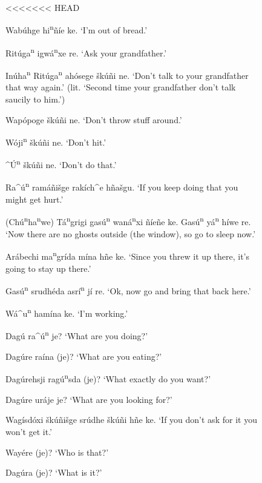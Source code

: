 \documentclass[output=paper]{LSP/langsci}
\begin{document}
\begin{figure}[p]
\begin{list}{}{} \itemsep1pt \parskip0pt 
<<<<<<< HEAD
\item{Wab\'uhge hi\textsuperscript{n}ñíe ke. `I'm out of bread.'}
\item{Rit\'uga\textsuperscript{n} igwá\textsuperscript{n}xe re. `Ask your grandfather.'}
\item{In\'uha\textsuperscript{n} Rit\'uga\textsuperscript{n} ahósege šk\'uñi ne. `Don't talk to your grandfather that way again.' (lit. `Second time your grandfather don't talk saucily to him.')}
\item{Wapópoge \v{s}k\'uñi ne. `Don't throw stuff around.'}
\item{Wóji\textsuperscript{n} \v{s}k\'uñi ne. `Don't hit.'}
\item{\^{ }\'U\textsuperscript{n} \v{s}k\'uñi ne. `Don't do that.'}
\item{}
\item{Ra\^{ }\'u\textsuperscript{n} ramáñi\v{s}ge rakích\^{ }e hña\v{s}gu. `If you keep doing that you might get hurt.'}
\item{(Ch\'u\textsuperscript{n}ha\textsuperscript{n}we) Tá\textsuperscript{n}grigi gas\'u\textsuperscript{n} waná\textsuperscript{n}xi ñíeñe ke. Gas\'u\textsuperscript{n} yá\textsuperscript{n} híwe re. `Now there are no ghosts outside (the window), so go to sleep now.'}
\item{Arábechi ma\textsuperscript{n}grída mína hñe ke. `Since you threw it up there, it's going to stay up there.'}
\item{Gas\'u\textsuperscript{n} srudh\'eda asrí\textsuperscript{n} jí re. `Ok, now go and bring that back here.'}
\item{}
\item{Wá\^{ }u\textsuperscript{n} hamína ke.	`I'm working.'}
\item{Dag\'u ra\^{ }\'u\textsuperscript{n} je? `What are you doing?'}
\item{Dag\'ure raína (je)? `What are you eating?'}
\item{Dag\'urehsji rag\'u\textsuperscript{n}sda (je)? `What exactly do you want?'}
\item{Dag\'ure uráje je? `What are you looking for?'}
\item{Wagísdóxi \v{s}k\'uñi\v{s}ge sr\'udhe \v{s}k\'uñi hñe ke. `If you don't ask for it you won't get it.'}
\item{Way\'ere (je)? `Who is that?'}
\item{Dag\'ura (je)? `What is it?'}

\end{list}
\end{figure}
\end{document}
